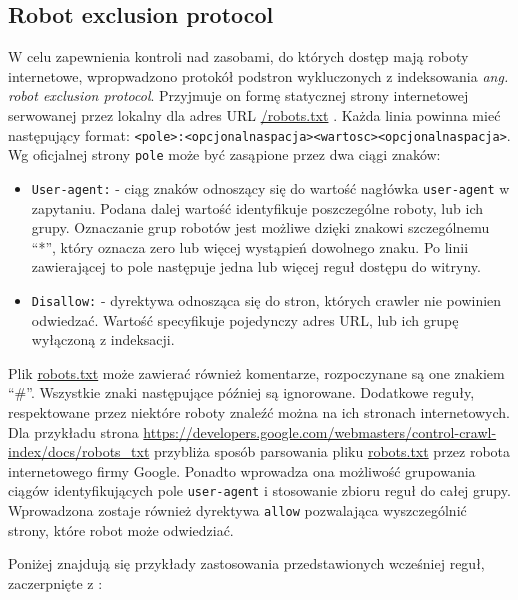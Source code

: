 
\subsection{Robot exclusion protocol}
\label{subsec:robotExcl}

W celu zapewnienia kontroli nad zasobami, do których dostęp mają roboty internetowe, wpropwadzono protokół podstron wykluczonych z indeksowania
\emph{ang. robot exclusion protocol}. Przyjmuje on formę statycznej strony internetowej serwowanej przez lokalny dla adres URL 
\url{/robots.txt} \cite{robotsTxt}. Każda linia powinna mieć następujący format: \texttt{<pole>:<opcjonalnaspacja><wartosc><opcjonalnaspacja>}.
Wg oficjalnej strony \cite{robotsTxt} \texttt{pole} może być zasąpione przez dwa ciągi znaków:
\begin{itemize}
    \item \texttt{User-agent:} - ciąg znaków odnoszący się do wartość nagłówka \texttt{user-agent} w zapytaniu. Podana dalej wartość identyfikuje
     poszczególne roboty, lub ich grupy. Oznaczanie grup robotów jest możliwe dzięki znakowi szczególnemu ``*'', który oznacza zero lub więcej
     wystąpień dowolnego znaku. Po linii zawierającej to pole następuje jedna lub więcej reguł dostępu do witryny. 
    \item \texttt{Disallow:} - dyrektywa odnosząca się do stron, których crawler nie powinien odwiedzać. Wartość specyfikuje pojedynczy adres URL, lub
     ich grupę wyłączoną z indeksacji.
\end{itemize}
Plik \url{robots.txt} może zawierać również komentarze, rozpoczynane są one znakiem ``\#''. Wszystkie znaki następujące później są ignorowane.
Dodatkowe reguły, respektowane przez niektóre roboty znaleźć można na ich stronach internetowych. Dla przykładu strona \url{https://developers.google.com/webmasters/control-crawl-index/docs/robots_txt}
przybliża sposób parsowania pliku \url{robots.txt} przez robota internetowego firmy Google. Ponadto wprowadza ona możliwość grupowania ciągów identyfikujących
pole \texttt{user-agent} i stosowanie zbioru reguł do całej grupy. Wprowadzona zostaje również dyrektywa \texttt{allow} pozwalająca wyszczególnić
strony, które robot może odwiedziać.

Poniżej znajdują się przykłady zastosowania przedstawionych wcześniej reguł, zaczerpnięte z \cite{robotsTxt}:

